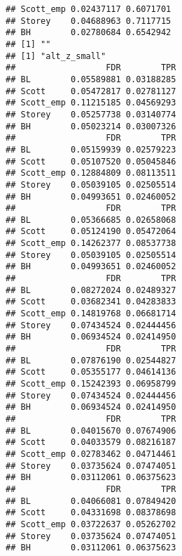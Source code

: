 \documentclass{article}\usepackage[]{graphicx}\usepackage[]{color}
\makeatletter
\newenvironment{kframe}{%
 \def\at@end@of@kframe{}%
 \ifinner\ifhmode%
  \def\at@end@of@kframe{\end{minipage}}%
  \begin{minipage}{\columnwidth}%
 \fi\fi%
 \def\FrameCommand##1{\hskip\@totalleftmargin \hskip-\fboxsep
 \colorbox{shadecolor}{##1}\hskip-\fboxsep
     \hskip-\linewidth \hskip-\@totalleftmargin \hskip\columnwidth}%
 \MakeFramed {\advance\hsize-\width
   \@totalleftmargin\z@ \linewidth\hsize
   \@setminipage}}%
 {\par\unskip\endMakeFramed%
 \at@end@of@kframe}
\newenvironment{knitrout}{}{} %
\makeatother
\begin{document}
\begin{knitrout}
\begin{kframe}
\begin{verbatim}
## Scott_emp 0.02437117 0.6071701
## Storey    0.04688963 0.7117715
## BH        0.02780684 0.6542942
## [1] ""
## [1] "alt_z_small"
##                  FDR        TPR
## BL        0.05589881 0.03188285
## Scott     0.05472817 0.02781127
## Scott_emp 0.11215185 0.04569293
## Storey    0.05257738 0.03140774
## BH        0.05023214 0.03007326
##                  FDR        TPR
## BL        0.05159939 0.02579223
## Scott     0.05107520 0.05045846
## Scott_emp 0.12884809 0.08113511
## Storey    0.05039105 0.02505514
## BH        0.04993651 0.02460052
##                  FDR        TPR
## BL        0.05366685 0.02658068
## Scott     0.05124190 0.05472064
## Scott_emp 0.14262377 0.08537738
## Storey    0.05039105 0.02505514
## BH        0.04993651 0.02460052
##                  FDR        TPR
## BL        0.08272024 0.02489327
## Scott     0.03682341 0.04283833
## Scott_emp 0.14819768 0.06681714
## Storey    0.07434524 0.02444456
## BH        0.06934524 0.02414950
##                  FDR        TPR
## BL        0.07876190 0.02544827
## Scott     0.05355177 0.04614136
## Scott_emp 0.15242393 0.06958799
## Storey    0.07434524 0.02444456
## BH        0.06934524 0.02414950
##                  FDR        TPR
## BL        0.04015670 0.07674906
## Scott     0.04033579 0.08216187
## Scott_emp 0.02783462 0.04714461
## Storey    0.03735624 0.07474051
## BH        0.03112061 0.06375623
##                  FDR        TPR
## BL        0.04066081 0.07849420
## Scott     0.04331698 0.08378698
## Scott_emp 0.03722637 0.05262702
## Storey    0.03735624 0.07474051
## BH        0.03112061 0.06375623
\end{verbatim}
\end{kframe}
\end{knitrout}
\end{document}
